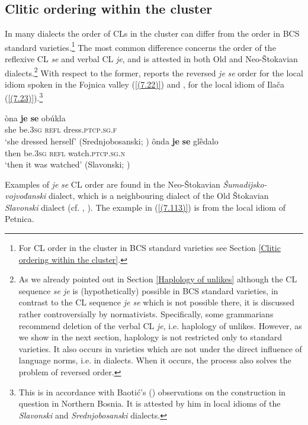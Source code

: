\subsection{Clitic ordering within the cluster}
\label{Clitic ordering within the cluster:8}
In many dialects the order of CLs in the cluster can differ from the order in BCS standard varieties.\footnote{For CL order in the cluster in BCS standard varieties see Section \ref{Clitic ordering within the cluster}.} The most common difference concerns the order of the reflexive CL \textit{se} and verbal CL \textit{je}, and is attested in both Old and Neo-Štokavian dialects.\footnote{As we already pointed out in Section \ref{Haplology of unlikes} although the CL sequence \textit{se je} is (hypothetically) possible in BCS standard varieties, in contrast to the CL sequence \textit{je se} which is not possible there, it is discussed rather controversially by normativists. Specifically, some grammarians recommend deletion of the verbal CL \textit{je}, i.e. haplology of unlikes. However, as we show in the next section, haplology is not restricted only to standard varieties. It also occurs in varieties which are not under the direct influence of language norms, i.e. in dialects. When it occurs, the process also solves the problem of reversed order.} With respect to the former, \citet[150]{Brozovic07} reports the reversed \textit{je} \textit{se} order for the local idiom spoken in the Fojnica valley (\ref{(7.22)}) and \citet[46]{Kolenic99}, for the local idiom of Ilača (\ref{(7.23)}).\footnote{This is in accordance with Baotić's (\citeyear[371]{Baotic85}) observations on the construction in question in Northern Bosnia. It is attested by him in local idioms of the \textit{Slavonski} and \textit{Srednjobosanski} dialects.}

\begin{exe}
\ex\label{(7.22)}
\gll òna  \textbf{je}  \textbf{se}  obúkla  \\
she be.\textsc{3sg}  \textsc{refl}  dress.\textsc{ptcp.sg.f} \\
\glt ‘she dressed herself’
\hfill  (Srednjobosanski; \citealt[150]{Brozovic07})
\ex\label{(7.23)}
\gll ônda  \textbf{je}  \textbf{se}  glȅdalo  \\
then be.\textsc{3sg}  \textsc{refl}  watch.\textsc{ptcp.sg.n} \\
\glt ‘then it was watched’
\hfill  (Slavonski; \citealt[46]{Kolenic99})
\end{exe}

\noindent Examples of \textit{je} \textit{se} CL order are found in the Neo-Štokavian \textit{Šumadijsko-voj\-vo\-đan\-ski} dialect, which is a neighbouring dialect of the Old Štokavian \textit{Slavonski} dialect (cf. \citealt[279]{Nikolic66}, \citealt[136]{Okuka08}). The example in (\ref{(7.113)}) is from the local idiom of Petnica. 

